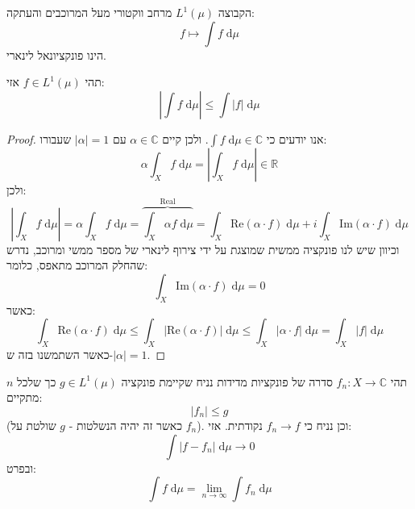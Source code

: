 \documentclass{tstextbook}
\begin{document}
\begin{corollary}
הקבוצה \({L}^{1}\left( \mu \right)\) מרחב ווקטורי מעל המרוכבים והעתקה:
$$f\mapsto \int f \;\mathrm{d} \mu $$
הינו פונקציונאל לינארי.

\end{corollary}
\begin{proposition}
תהי \(f \in L^{1}\left( \mu \right)\) אזי:
$$\left\lvert  \int f \;\mathrm{d} \mu   \right\rvert \leq \int \lvert f \rvert  \;\mathrm{d} \mu $$

\end{proposition}
\begin{proof}
אנו יודעים כי \(\int f \;\mathrm{d} \mu \in \mathbb{C}\). ולכן קיים \(\alpha \in \mathbb{C}\) עם \(\left\lvert  \alpha  \right\rvert=1\) שעבורו:
$$\alpha \int_{X} f \;\mathrm{d} \mu = \left\lvert  \int_{X} f \;\mathrm{d} \mu   \right\rvert  \in \mathbb{R}$$
ולכן:
$$\left\lvert  \int_{X} f \;\mathrm{d} \mu   \right\rvert =\alpha \int_{X} f \;\mathrm{d} \mu = \overbrace{ \int_{X} \alpha f\;\mathrm{d} \mu }^{ \text{Real} }  =\int_{X} \mathrm{Re}\left( \alpha \cdot f \right) \;\mathrm{d} \mu + i \int_{X} \mathrm{Im}\left( \alpha \cdot f \right) \;\mathrm{d} \mu  $$
וכיוון שיש לנו פונקציה ממשית שמוצגת על ידי צירוף לינארי של מספר ממשי ומרוכב, נדרש שהחלק המרוכב מתאפס, כלומר:
$$\int_{X} \mathrm{Im}\left( \alpha \cdot f \right) \;\mathrm{d} \mu=0 $$
כאשר:
$$\int_{X} \mathrm{Re}\left( \alpha \cdot f \right) \;\mathrm{d} \mu \leq \int_{X} \left\lvert  \mathrm{Re}\left( \alpha \cdot f \right)  \right\rvert  \;\mathrm{d} \mu \leq \int_{X}  \left\lvert  \alpha \cdot f  \right\rvert  \;\mathrm{d} \mu = \int_{X} \lvert f \rvert  \;\mathrm{d} \mu   $$
כאשר השתמשנו בזה ש-\(\left\lvert  \alpha  \right\rvert=1\).

\end{proof}
\begin{theorem}
תהי \(f_{n}:X\to \mathbb{C}\) סדרה של פונקציות מדידות נניח שקיימת פונקציה \(g \in L^{1}\left( \mu \right)\) כך שלכל \(n\) מתקיים:
$$\lvert f_{n} \rvert \leq g$$
(כאשר זה יהיה הנשלטות - \(g\) שולטת על \(f_{n}\)). וכן נניח כי \(f_{n}\to f\) נקודתית. אזי:
$$\int \lvert f-f_{n} \rvert  \;\mathrm{d} \mu \xrightarrow{} 0 $$
ובפרט:
$$\int f \;\mathrm{d} \mu = \lim_{ n \to \infty } \int f_{n} \;\mathrm{d} \mu  $$

\end{theorem}
\end{document}
